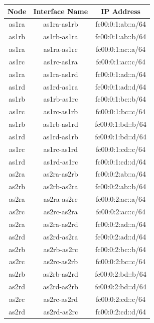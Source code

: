 \begin{table}[h!]
\centering
\begin{tabular}{|c|c|c|}
\hline
\textbf{Node} & \textbf{Interface Name} & \textbf{IP Address} \\
\hline
as1ra & as1ra-as1rb & fc00:0:1:ab::a/64 \\
as1rb & as1rb-as1ra & fc00:0:1:ab::b/64 \\

as1ra & as1ra-as1rc & fc00:0:1:ac::a/64 \\
as1rc & as1rc-as1ra & fc00:0:1:ac::c/64 \\

as1ra & as1ra-as1rd & fc00:0:1:ad::a/64 \\
as1rd & as1rd-as1ra & fc00:0:1:ad::d/64 \\

as1rb & as1rb-as1rc & fc00:0:1:bc::b/64 \\
as1rc & as1rc-as1rb & fc00:0:1:bc::c/64 \\

as1rb & as1rb-as1rd & fc00:0:1:bd::b/64 \\
as1rd & as1rd-as1rb & fc00:0:1:bd::d/64 \\

as1rc & as1rc-as1rd & fc00:0:1:cd::c/64 \\
as1rd & as1rd-as1rc & fc00:0:1:cd::d/64 \\

as2ra & as2ra-as2rb & fc00:0:2:ab::a/64 \\
as2rb & as2rb-as2ra & fc00:0:2:ab::b/64 \\

as2ra & as2ra-as2rc & fc00:0:2:ac::a/64 \\
as2rc & as2rc-as2ra & fc00:0:2:ac::c/64 \\

as2ra & as2ra-as2rd & fc00:0:2:ad::a/64 \\
as2rd & as2rd-as2ra & fc00:0:2:ad::d/64 \\

as2rb & as2rb-as2rc & fc00:0:2:bc::b/64 \\
as2rc & as2rc-as2rb & fc00:0:2:bc::c/64 \\

as2rb & as2rb-as2rd & fc00:0:2:bd::b/64 \\
as2rd & as2rd-as2rb & fc00:0:2:bd::d/64 \\

as2rc & as2rc-as2rd & fc00:0:2:cd::c/64 \\
as2rd & as2rd-as2rc & fc00:0:2:cd::d/64 \\


\end{tabular}
\end{table}
